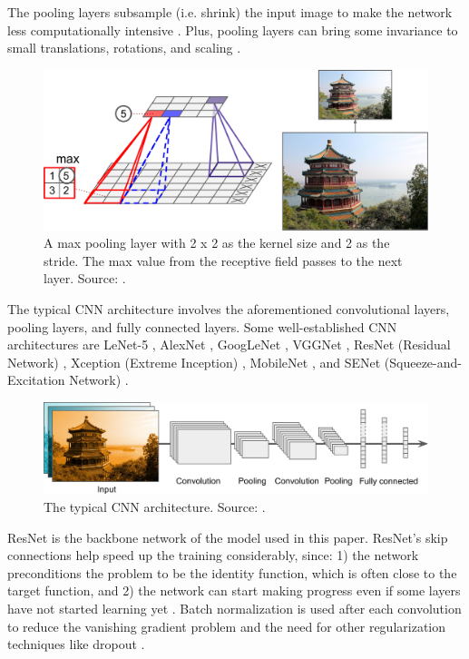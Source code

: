 \documentclass[a4paper, 11pt, oneside]{article}
\begin{document}
The pooling layers subsample (i.e. shrink) the input image to make the network less computationally intensive
\cite{geron2019hands}. Plus, pooling layers can bring some invariance to small translations, rotations, and scaling
\cite{geron2019hands}.

\begin{figure}[ht]
  \begin{center}
    \includegraphics[width=.5\textwidth]{max_pooling.png}
  \end{center}
  \caption{A max pooling layer with 2 x 2 as the kernel size and 2 as the stride. The max value from the receptive
  field passes to the next layer. Source: \cite{geron2019hands}.}
\end{figure}

The typical CNN architecture involves the aforementioned convolutional layers, pooling layers, and fully connected layers.
Some well-established CNN architectures are LeNet-5 \cite{lecun1998gradient}, AlexNet \cite{krizhevsky2012imagenet},
GoogLeNet \cite{szegedy2015going}, VGGNet \cite{simonyan2014very}, ResNet (Residual Network) \cite{he2016deep}, Xception
(Extreme Inception) \cite{chollet2017xception}, MobileNet \cite{howard2017mobilenets, sandler2018mobilenetv2},
and SENet (Squeeze-and-Excitation Network) \cite{hu2018squeeze}.

\begin{figure}[ht]
  \begin{center}
    \includegraphics[width=.8\textwidth]{typical_cnn.png}
  \end{center}
  \caption{The typical CNN architecture. Source: \cite{geron2019hands}.}
\end{figure}

ResNet is the backbone network of the model used in this paper. ResNet's skip connections help speed up the training
considerably, since: 1) the network preconditions the problem to be the identity function, which is often close to the
target function, and 2) the network can start making progress even if some layers have not started learning yet
\cite{geron2019hands, he2016deep}. Batch normalization \cite{ioffe2015batch} is used after each convolution
to reduce the vanishing gradient problem \cite{hochreiter1998vanishing} and the need for other regularization techniques
like dropout \cite{srivastava2014dropout}.
\end{document}
